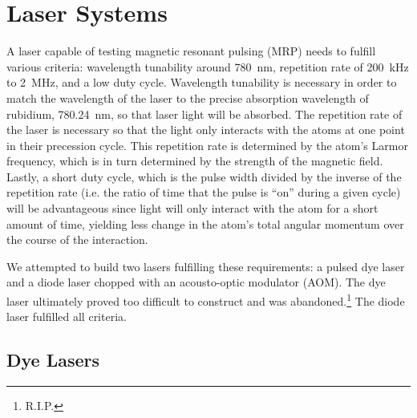 



\chapter{Laser Systems}

A laser capable of testing magnetic resonant pulsing (MRP) needs to fulfill various criteria: wavelength tunability around \SI{780}{\nano \meter}, repetition rate of \SI{200}{ kHz} to \SI{2}{ MHz}, and a low duty cycle. Wavelength tunability is necessary in order to match the wavelength of the laser to the precise absorption wavelength of rubidium, \SI{780.24}{\nano \meter}, so that laser light will be absorbed. The repetition rate of the laser is necessary so that the light only interacts with the atoms at one point in their precession cycle. This repetition rate is determined by the atom's Larmor frequency, which is in turn determined by the strength of the magnetic field. Lastly, a short duty cycle, which is the pulse width divided by the inverse of the repetition rate (i.e. the ratio of time that the pulse is ``on'' during a given cycle) will be advantageous since light will only interact with the atom for a short amount of time, yielding less change in the atom's total angular momentum over the course of the interaction.

We attempted to build two lasers fulfilling these requirements: a pulsed dye laser and a diode laser chopped with an acousto-optic modulator (AOM). The dye laser ultimately proved too difficult to construct and was abandoned.\footnote{R.I.P.} The diode laser fulfilled all criteria.


\section{Dye Lasers}

